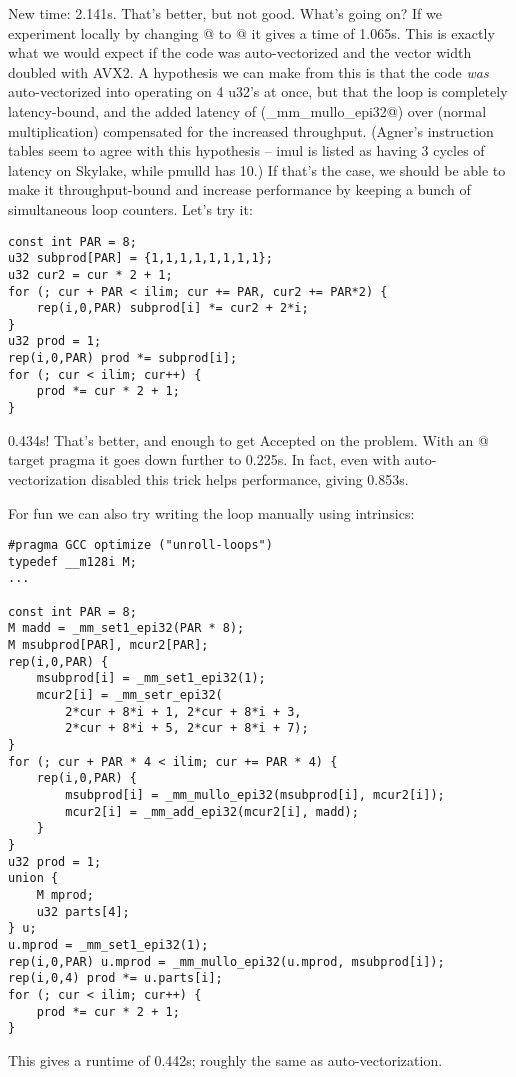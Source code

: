 New time: 2.141s. That's better, but not good. What's going on?
If we experiment locally by changing @ to @ it gives a time of 1.065s.
This is exactly what we would expect if the code was auto-vectorized and the vector width doubled with AVX2.
A hypothesis we can make from this is that the code \emph{was} auto-vectorized into operating on 4 u32's at once, but that the loop is completely latency-bound, and the added latency of \verb@pmulld@ (\verb@_mm_mullo_epi32@) over \verb@imul@ (normal multiplication) compensated for the increased throughput.
(Agner's instruction tables seem to agree with this hypothesis -- imul is listed as having 3 cycles of latency on Skylake, while pmulld has 10.)
If that's the case, we should be able to make it throughput-bound and increase performance by keeping a bunch of simultaneous loop counters.
Let's try it:

\begin{lstlisting}
const int PAR = 8;
u32 subprod[PAR] = {1,1,1,1,1,1,1,1};
u32 cur2 = cur * 2 + 1;
for (; cur + PAR < ilim; cur += PAR, cur2 += PAR*2) {
	rep(i,0,PAR) subprod[i] *= cur2 + 2*i;
}
u32 prod = 1;
rep(i,0,PAR) prod *= subprod[i];
for (; cur < ilim; cur++) {
	prod *= cur * 2 + 1;
}
\end{lstlisting}

0.434s! That's better, and enough to get Accepted on the problem.
With an @ target pragma it goes down further to 0.225s.
In fact, even with auto-vectorization disabled this trick helps performance, giving 0.853s.

For fun we can also try writing the loop manually using intrinsics:
\begin{lstlisting}
#pragma GCC optimize ("unroll-loops")
typedef __m128i M;
...

const int PAR = 8;
M madd = _mm_set1_epi32(PAR * 8);
M msubprod[PAR], mcur2[PAR];
rep(i,0,PAR) {
	msubprod[i] = _mm_set1_epi32(1);
	mcur2[i] = _mm_setr_epi32(
	    2*cur + 8*i + 1, 2*cur + 8*i + 3,
	    2*cur + 8*i + 5, 2*cur + 8*i + 7);
}
for (; cur + PAR * 4 < ilim; cur += PAR * 4) {
	rep(i,0,PAR) {
		msubprod[i] = _mm_mullo_epi32(msubprod[i], mcur2[i]);
		mcur2[i] = _mm_add_epi32(mcur2[i], madd);
	}
}
u32 prod = 1;
union {
	M mprod;
	u32 parts[4];
} u;
u.mprod = _mm_set1_epi32(1);
rep(i,0,PAR) u.mprod = _mm_mullo_epi32(u.mprod, msubprod[i]);
rep(i,0,4) prod *= u.parts[i];
for (; cur < ilim; cur++) {
	prod *= cur * 2 + 1;
}
\end{lstlisting}

This gives a runtime of 0.442s; roughly the same as auto-vectorization.

